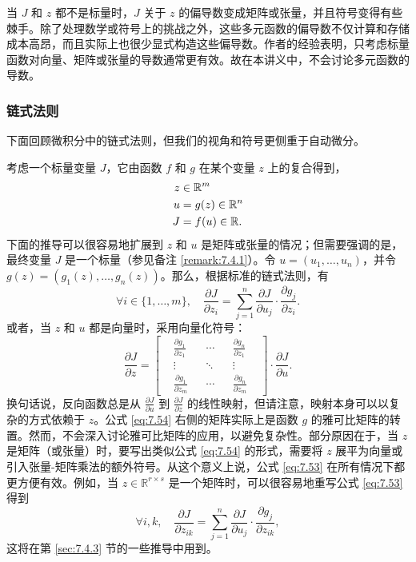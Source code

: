 \begin{remark}\label{remark:7.4.1}
    当 $J$ 和 $z$ 都不是标量时，$J$ 关于 $z$ 的偏导数变成矩阵或张量，并且符号变得有些棘手。除了处理数学或符号上的挑战之外，这些多元函数的偏导数不仅计算和存储成本高昂，而且实际上也很少显式构造这些偏导数。作者的经验表明，只考虑标量函数对向量、矩阵或张量的导数通常更有效。故在本讲义中，不会讨论多元函数的导数。
\end{remark} 

\subsubsection*{链式法则}

下面回顾微积分中的链式法则，但我们的视角和符号更侧重于自动微分。

考虑一个标量变量 $J$，它由函数 $f$ 和 $g$ 在某个变量 $z$ 上的复合得到，
\begin{align}
    z &\in \mathbb{R}^m \notag\\
    u &= g(z) \in \mathbb{R}^n \notag\\
    J &= f(u) \in \mathbb{R}. \label{eq:7.52}
\end{align}
下面的推导可以很容易地扩展到 $z$ 和 $u$ 是矩阵或张量的情况；但需要强调的是，最终变量 $J$ 是一个标量（参见备注 \ref{remark:7.4.1}）。令 $u = (u_1, \dots, u_n)$，并令 $g(z) = \left(g_1(z), \dots, g_n(z)\right)$。那么，根据标准的链式法则，有
\begin{equation}
    \forall i \in \{1, \dots, m\}, \quad \frac{\partial J}{\partial z_i} = \sum_{j=1}^n \frac{\partial J}{\partial u_j} \cdot \frac{\partial g_j}{\partial z_i}. \label{eq:7.53}
\end{equation}
或者，当 $z$ 和 $u$ 都是向量时，采用向量化符号：
\begin{equation}
    \frac{\partial J}{\partial z} = \begin{bmatrix}
    &\frac{\partial g_1}{\partial z_1}&  &\cdots&  &\frac{\partial g_n}{\partial z_1}& \\
    &\vdots&  &\ddots&  &\vdots& \\
    &\frac{\partial g_1}{\partial z_m}&  &\cdots&  &\frac{\partial g_n}{\partial z_m}&
    \end{bmatrix} \cdot \frac{\partial J}{\partial u}. \label{eq:7.54}
\end{equation}
换句话说，反向函数总是从 $\frac{\partial J}{\partial u}$ 到 $\frac{\partial J}{\partial z}$ 的线性映射，但请注意，映射本身可以以复杂的方式依赖于 $z$。公式 \eqref{eq:7.54} 右侧的矩阵实际上是函数 $g$ 的雅可比矩阵的转置。然而，不会深入讨论雅可比矩阵的应用，以避免复杂性。部分原因在于，当 $z$ 是矩阵（或张量）时，要写出类似公式 \eqref{eq:7.54} 的形式，需要将 $z$ 展平为向量或引入张量-矩阵乘法的额外符号。从这个意义上说，公式 \eqref{eq:7.53} 在所有情况下都更方便有效。例如，当 $z \in \mathbb{R}^{r \times s}$ 是一个矩阵时，可以很容易地重写公式 \eqref{eq:7.53} 得到
\begin{equation}
    \forall i, k, \quad \frac{\partial J}{\partial z_{ik}} = \sum_{j=1}^n \frac{\partial J}{\partial u_j} \cdot \frac{\partial g_j}{\partial z_{ik}}, \label{eq:7.55}
\end{equation}
这将在第 \ref{sec:7.4.3} 节的一些推导中用到。

